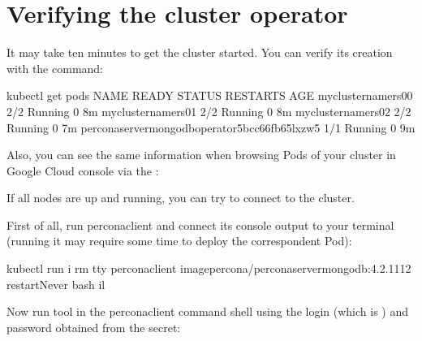 \documentclass[letterpaper,10pt,english]{sphinxmanual}
\begin{document}
\section{Verifying the cluster operator}
\label{\detokenize{gke:verifying-the-cluster-operator}}
It may take ten minutes to get the cluster started. You  can verify its creation with the  command:

\begin{sphinxVerbatim}[commandchars=\\\{\}]
\PYGZdl{} kubectl get pods
NAME                                                      READY   STATUS    RESTARTS   AGE
my\PYGZhy{}cluster\PYGZhy{}name\PYGZhy{}rs0\PYGZhy{}0                                     2/2     Running   0          8m
my\PYGZhy{}cluster\PYGZhy{}name\PYGZhy{}rs0\PYGZhy{}1                                     2/2     Running   0          8m
my\PYGZhy{}cluster\PYGZhy{}name\PYGZhy{}rs0\PYGZhy{}2                                     2/2     Running   0          7m
percona\PYGZhy{}server\PYGZhy{}mongodb\PYGZhy{}operator\PYGZhy{}5bcc66fb65\PYGZhy{}lxzw5          1/1     Running   0          9m
\end{sphinxVerbatim}

Also, you can see the same information when browsing Pods of your cluster in Google Cloud console via the :


If all nodes are up and running, you can try to connect to the cluster.

First of all, run percona\sphinxhyphen{}client and connect its console output to your
terminal (running it may require some time to deploy the correspondent Pod):

\begin{sphinxVerbatim}[commandchars=\\\{\}]
kubectl run \PYGZhy{}i \PYGZhy{}\PYGZhy{}rm \PYGZhy{}\PYGZhy{}tty percona\PYGZhy{}client \PYGZhy{}\PYGZhy{}imagepercona/percona\PYGZhy{}server\PYGZhy{}mongodb:4.2.11\PYGZhy{}12 \PYGZhy{}\PYGZhy{}restartNever \PYGZhy{}\PYGZhy{} bash \PYGZhy{}il
\end{sphinxVerbatim}

Now run  tool in the percona\sphinxhyphen{}client command shell using the login
(which is ) and password obtained from the secret:
\end{document}

